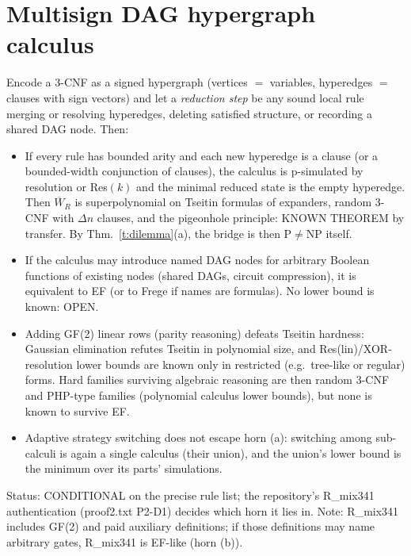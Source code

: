 \documentclass[11pt]{article}
\theoremstyle{definition}
\theoremstyle{remark}
\newcommand{\WR}[1]{\overline{W}_{#1}}
\begin{document}
\section{Multisign DAG hypergraph calculus}\label{s:hyper}
Encode a 3-CNF as a signed hypergraph (vertices $=$ variables, hyperedges $=$ clauses with sign vectors) and let a \emph{reduction step}
be any sound local rule merging or resolving hyperedges, deleting satisfied structure, or recording a shared DAG node. Then:
\begin{itemize}
\item If every rule has bounded arity and each new hyperedge is a clause (or a bounded-width conjunction of clauses), the calculus is p-simulated
by resolution or Res$(k)$ and the minimal reduced state is the empty hyperedge. Then $\WR{R}$ is superpolynomial on Tseitin formulas of expanders,
random 3-CNF with $\Delta n$ clauses, and the pigeonhole principle: KNOWN THEOREM by transfer. By Thm.~\ref{t:dilemma}(a), the bridge is then P$\ne$NP itself.
\item If the calculus may introduce named DAG nodes for arbitrary Boolean functions of existing nodes (shared DAGs, circuit compression), it is equivalent to EF (or
to Frege if names are formulas). No lower bound is known: OPEN.
\item Adding GF(2) linear rows (parity reasoning) defeats Tseitin hardness: Gaussian elimination refutes Tseitin in polynomial size, and
Res(lin)/XOR-resolution lower bounds are known only in restricted (e.g.\ tree-like or regular) forms. Hard families surviving algebraic reasoning are then random 3-CNF and
PHP-type families (polynomial calculus lower bounds), but none is known to survive EF.
\item Adaptive strategy switching does not escape horn (a): switching among sub-calculi is again a single calculus (their union), and the union's
lower bound is the minimum over its parts' simulations.
\end{itemize}
Status: CONDITIONAL on the precise rule list; the repository's R\_mix341 authentication (proof2.txt P2-D1) decides which horn it lies in.
Note: R\_mix341 includes GF(2) and paid auxiliary definitions; if those definitions may name arbitrary gates, R\_mix341 is EF-like (horn (b)).
\end{document}
